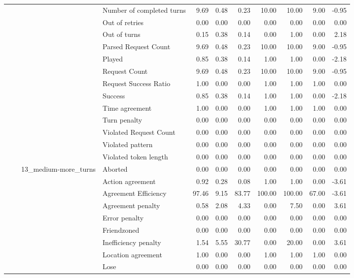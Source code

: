 \begin{tabular}{llllrrrrrrr}
 &  &  & Number of completed turns & 9.69 & 0.48 & 0.23 & 10.00 & 10.00 & 9.00 & -0.95 \\
 &  &  & Out of retries & 0.00 & 0.00 & 0.00 & 0.00 & 0.00 & 0.00 & 0.00 \\
 &  &  & Out of turns & 0.15 & 0.38 & 0.14 & 0.00 & 1.00 & 0.00 & 2.18 \\
 &  &  & Parsed Request Count & 9.69 & 0.48 & 0.23 & 10.00 & 10.00 & 9.00 & -0.95 \\
 &  &  & Played & 0.85 & 0.38 & 0.14 & 1.00 & 1.00 & 0.00 & -2.18 \\
 &  &  & Request Count & 9.69 & 0.48 & 0.23 & 10.00 & 10.00 & 9.00 & -0.95 \\
 &  &  & Request Success Ratio & 1.00 & 0.00 & 0.00 & 1.00 & 1.00 & 1.00 & 0.00 \\
 &  &  & Success & 0.85 & 0.38 & 0.14 & 1.00 & 1.00 & 0.00 & -2.18 \\
 &  &  & Time agreement & 1.00 & 0.00 & 0.00 & 1.00 & 1.00 & 1.00 & 0.00 \\
 &  &  & Turn penalty & 0.00 & 0.00 & 0.00 & 0.00 & 0.00 & 0.00 & 0.00 \\
 &  &  & Violated Request Count & 0.00 & 0.00 & 0.00 & 0.00 & 0.00 & 0.00 & 0.00 \\
 &  &  & Violated pattern & 0.00 & 0.00 & 0.00 & 0.00 & 0.00 & 0.00 & 0.00 \\
 &  &  & Violated token length & 0.00 & 0.00 & 0.00 & 0.00 & 0.00 & 0.00 & 0.00 \\
\cline{3-11}
 &  & \multirow[t]{27}{*}{13_medium-more_turns} & Aborted & 0.00 & 0.00 & 0.00 & 0.00 & 0.00 & 0.00 & 0.00 \\
 &  &  & Action agreement & 0.92 & 0.28 & 0.08 & 1.00 & 1.00 & 0.00 & -3.61 \\
 &  &  & Agreement Efficiency & 97.46 & 9.15 & 83.77 & 100.00 & 100.00 & 67.00 & -3.61 \\
 &  &  & Agreement penalty & 0.58 & 2.08 & 4.33 & 0.00 & 7.50 & 0.00 & 3.61 \\
 &  &  & Error penalty & 0.00 & 0.00 & 0.00 & 0.00 & 0.00 & 0.00 & 0.00 \\
 &  &  & Friendzoned & 0.00 & 0.00 & 0.00 & 0.00 & 0.00 & 0.00 & 0.00 \\
 &  &  & Inefficiency penalty & 1.54 & 5.55 & 30.77 & 0.00 & 20.00 & 0.00 & 3.61 \\
 &  &  & Location agreement & 1.00 & 0.00 & 0.00 & 1.00 & 1.00 & 1.00 & 0.00 \\
 &  &  & Lose & 0.00 & 0.00 & 0.00 & 0.00 & 0.00 & 0.00 & 0.00 \\

\end{tabular}
